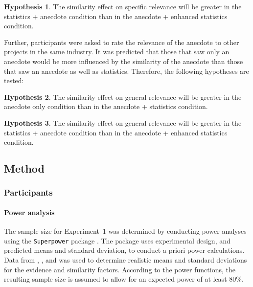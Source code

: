 \documentclass[a4paper, nobind, dvipsnames]{templates/ociamthesis}
\theoremstyle{definition}
\theoremstyle{definition}
\theoremstyle{definition}
\theoremstyle{definition}
\newtheorem{hypothesis}{Hypothesis}[chapter]
\theoremstyle{remark}
\begin{document}
\begin{hypothesis}
\protect\hypertarget{hyp:relevance-specific-enhanced-anecdotes-1}{}{\label{hyp:relevance-specific-enhanced-anecdotes-1} }The similarity effect on specific relevance will be greater in the statistics +
anecdote condition than in the anecdote + enhanced statistics condition.
\end{hypothesis}

Further, participants were asked to rate the relevance of the anecdote to other
projects in the same industry. It was predicted that those that saw only an anecdote
would be more influenced by the similarity of the anecdote than those that saw
an anecdote as well as statistics. Therefore, the following hypotheses are
tested:

\begin{hypothesis}
\protect\hypertarget{hyp:relevance-general-anecdotes-1}{}{\label{hyp:relevance-general-anecdotes-1} }The similarity effect on general relevance will be greater in the anecdote only
condition than in the anecdote + statistics condition.
\end{hypothesis}

\begin{hypothesis}
\protect\hypertarget{hyp:relevance-general-enhanced-anecdotes-1}{}{\label{hyp:relevance-general-enhanced-anecdotes-1} }The similarity effect on general relevance will be greater in the statistics +
anecdote condition than in the anecdote + enhanced statistics condition.
\end{hypothesis}

\hypertarget{method-anecdotes-1-appendix}{%
\subsection{Method}\label{method-anecdotes-1-appendix}}

\subsubsection{Participants}

\hypertarget{power-analysis-anecdotes-1}{%
\paragraph{Power analysis}\label{power-analysis-anecdotes-1}}

The sample size for Experiment~1 was determined by conducting power analyses
using the \texttt{Superpower} package \autocite{lakens2019}. The package uses experimental
design, and predicted means and standard deviation, to conduct a priori power
calculations. Data from \textcite{wainberg2018}, \textcite{jaramillo2019}, and \textcite[Study 3]{hoeken2009}
was used to determine realistic means and standard deviations for the evidence
and similarity factors. According to the power functions, the resulting sample
size is assumed to allow for an expected power of at least 80\%.
\end{document}
